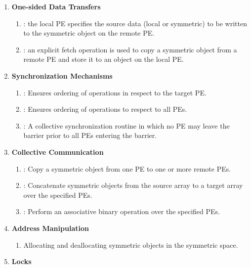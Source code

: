 \begin{enumerate}
\item \textbf{One-sided Data Transfers }

\begin{enumerate}
\item {}: the local \ac{PE} specifies the source
data (local or symmetric) to be written to the symmetric object on the remote \ac{PE}. 
\item {}: an explicit fetch operation is used to copy a symmetric object
from a remote \ac{PE} and store it to an object on the local \ac{PE}.
\end{enumerate}

\item \textbf{Synchronization Mechanisms }
\begin{enumerate}
\item {}: Ensures ordering of  operations in respect to the target \ac{PE}. 
\item {}: Ensures ordering of  operations to respect to all \acp{PE}. 
\item {}: A collective synchronization routine in which no \ac{PE} may leave
the barrier prior to all \ac{PE}s entering the barrier. 
\end{enumerate}
\item \textbf{Collective Communication}

\begin{enumerate}
\item {}: Copy a symmetric object from one \ac{PE} to one or more remote
\acp{PE}. 
\item {}: Concatenate symmetric objects from the source array to a target
array over the specified \acp{PE}. 
\item {}: Perform an associative binary operation over the specified
\ac{PE}s. 
\end{enumerate}
\item \textbf{Address Manipulation}

\begin{enumerate}
\item Allocating and deallocating symmetric objects in the symmetric space.
\end{enumerate}
\item \textbf{Locks}


\end{enumerate}
